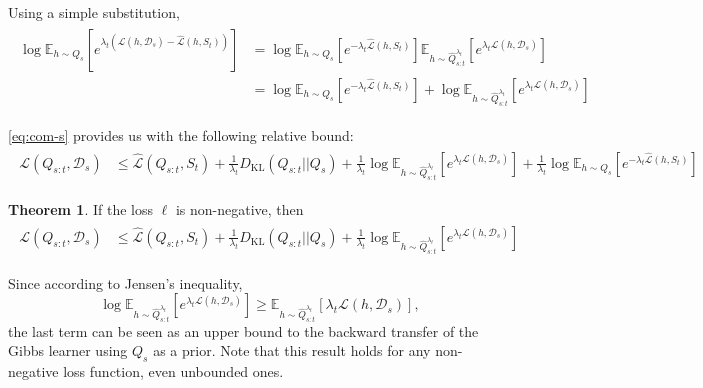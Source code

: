 \documentclass[letterpaper]{article}
\theoremstyle{definition}
\newtheorem{theorem}{Theorem}
\begin{document}
Using a simple substitution, 
\begin{align} \label{eq:com-s}
\begin{split}
\log\mathbb{E}_{h\sim Q_{s}}\left [e^{\lambda_t(\mathcal{L}(h,\mathcal{D}_s)-\hat{\mathcal{L}}(h,S_t))} \right ]&=\log \mathbb{E}_{h\sim Q_s}\left [e^{-\lambda_t\hat{\mathcal{L}}(h,S_t)} \right ] \mathbb{E}_{h\sim \hat{Q}_{s:t}^{\lambda_t}}\left [e^{\lambda_t\mathcal{L}(h,\mathcal{D}_s)} \right ]\\
&=\log \mathbb{E}_{h\sim Q_s}\left [e^{-\lambda_t\hat{\mathcal{L}}(h,S_t)} \right ]+\log \mathbb{E}_{h\sim \hat{Q}_{s:t}^{\lambda_t}}\left [e^{\lambda_t\mathcal{L}(h,\mathcal{D}_s)} \right ]
\end{split}
\end{align}

\eqref{eq:com-s} provides us with the following relative bound:
\begin{align*}
\begin{split}
\mathcal{L}(Q_{s:t}, \mathcal{D}_s) &\leq \hat{\mathcal{L}}(Q_{s:t}, S_t) + \frac{1}{\lambda_t} D_{\mathrm{KL}}(Q_{s:t}||Q_{s})
+\frac{1}{\lambda_t}\log \mathbb{E}_{h\sim \hat{Q}_{s:t}^{\lambda_t}}\left [e^{\lambda_t\mathcal{L}(h,\mathcal{D}_s)}\right ]+\frac{1}{\lambda_t}\log \mathbb{E}_{h\sim Q_s}\left [e^{-\lambda_t\hat{\mathcal{L}}(h,S_t)} \right ]
\end{split}
\end{align*}

\begin{theorem}
If the loss $\ell$ is non-negative, then    
\begin{align}
\begin{split}
\mathcal{L}(Q_{s:t}, \mathcal{D}_s) &\leq \hat{\mathcal{L}}(Q_{s:t}, S_t) + \frac{1}{\lambda_t} D_{\mathrm{KL}}(Q_{s:t}||Q_{s})
+\frac{1}{\lambda_t}\log \mathbb{E}_{h\sim \hat{Q}_{s:t}^{\lambda_t}}\left [e^{\lambda_t\mathcal{L}(h,\mathcal{D}_s)}\right ]
\end{split}
\end{align}
\end{theorem}


Since according to Jensen's inequality, $$\log \mathbb{E}_{h\sim \hat{Q}_{s:t}^{\lambda_t}}\left [e^{\lambda_t\mathcal{L}(h,\mathcal{D}_s)}\right ]\geq \mathbb{E}_{h\sim \hat{Q}_{s:t}^{\lambda_t}}\left [\lambda_t\mathcal{L}(h,\mathcal{D}_s)\right ],$$
the last term can be seen as an upper bound to the backward transfer of the Gibbs learner using $Q_s$ as a prior. Note that this result holds for any non-negative loss function, even unbounded ones.
\end{document}
